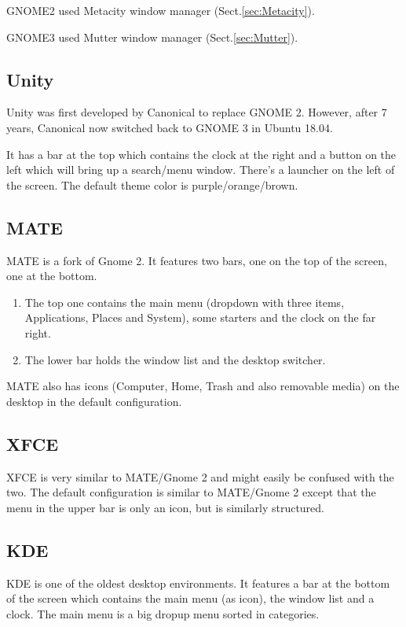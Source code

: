 GNOME2 used Metacity window manager (Sect.\ref{sec:Metacity}).

GNOME3 used Mutter window manager (Sect.\ref{sec:Mutter}). 

\subsection{Unity}
\label{sec:Unity}

Unity was first developed by Canonical to replace GNOME 2. However, after 7
years, Canonical now switched back to GNOME 3 in Ubuntu 18.04.

It has a bar at the top which contains the clock at the right and a button on
the left which will bring up a search/menu window. There's a launcher on the
left of the screen. The default theme color is purple/orange/brown.

\subsection{MATE}
\label{sec:MATE}

MATE is a fork of Gnome 2. It features two bars, one on the top of the screen,
one at the bottom. 
\begin{enumerate}
  \item  The top one contains the main menu (dropdown with three items,
  Applications, Places and System), some starters and the clock on the far right. 
  
  \item The lower bar holds the window list and the desktop switcher.
\end{enumerate}
MATE also has icons (Computer, Home, Trash and also removable media) on the
desktop in the default configuration.

\subsection{XFCE}
\label{sec:XCFE}

XFCE is very similar to MATE/Gnome 2 and might easily be confused with the two.
The default configuration is similar to MATE/Gnome 2 except that the menu in the
upper bar is only an icon, but is similarly structured.

\subsection{KDE}
\label{sec:KDE}

KDE is one of the oldest desktop environments. It features a bar at the bottom
of the screen which contains the main menu (as icon), the window list and a
clock. The main menu is a big dropup menu sorted in categories. 

